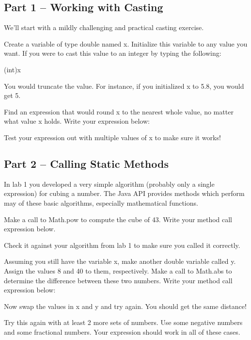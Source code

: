 \subsection{Part 1 -- Working with Casting}

We'll start with a mildly challenging and practical casting exercise.

\begin{exer}

Create a variable of type double named x. Initialize this variable to any value you want. If you were to cast 
this value to an integer by typing the following:

\begin{code}
(int)x
\end{code}

You would truncate the value. For instance, if you initialized x to 5.8, you would get 5. 

Find an expression that would round x to the nearest whole value, no matter what value x holds. Write your 
expression below:

\evalline

Test your expression out with multiple values of x to make sure it works!
\end{exer}


\initialbox


\subsection{Part 2 -- Calling Static Methods}

In lab 1 you developed a very simple algorithm (probably only a single expression) for cubing a number. The Java API provides methods which perform may of these basic algorithms, especially mathematical functions. 

\begin{exer}
Make a call to Math.pow to compute the cube of 43. Write your method call expression below. 

\evalline

Check it against your algorithm from lab 1 to make sure you called it correctly. 
\end{exer}

\begin{exer}
Assuming you still have the variable x, make another double variable called y. Assign the values 8 and 40 to them, respectively. Make a call to Math.abs to determine the difference between these two numbers. Write your method call expression below:

\evalline

Now swap the values in x and y and try again. You should get the same distance!

Try this again with at least 2 more sets of numbers. Use some negative numbers and some fractional numbers. Your expression should work in all of these cases. 
\end{exer}

